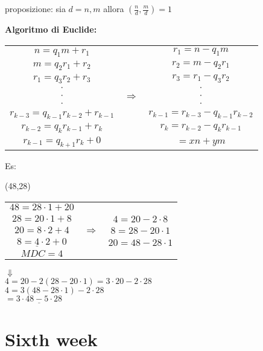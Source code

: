 \documentclass[12pt, a4paper]{article}
\begin{document}
proposizione: sia $d=n,m$ allora $(\frac{n}{d},\frac{m}{d})=1$

\textbf{Algoritmo di Euclide:}
\begin{center}
    \begin{tabular}{ c c c }
        
        $n=q_{1}m+r_{1}$ & & $r_{1}=n-q_{1}m$\\
        $m=q_{2}r_{1}+r_{2}$ & & $r_{2}=m-q_{2}r_{1}$\\
        $r_{1}=q_{3}r_{2}+r_{3}$ & &$r_{3}=r_{1}-q_{3}r_{2}$\\
        $\cdot$ & &$\cdot$\\
        $\cdot$ & $\Rightarrow$ & $\cdot$\\
        $\cdot$ & & $\cdot$\\
        $r_{k-3}=q_{k-1}r_{k-2}+r_{k-1}$ & &$r_{k-1}=r_{k-3}-q_{k-1}r_{k-2}$\\
        $r_{k-2}=q_{k}r_{k-1}+r_{k}$ & & $r_{k}=r_{k-2}-q_{k}r_{k-1}$\\
        $r_{k-1}=q_{k+1}r_{k}+0$ & & $= xn+ym$
        
    \end{tabular}
\end{center}

Es:
\begin{center}
    (48,28)

    \begin{tabular}{ c c c }
        $48=28\cdot 1 + 20$ & &\\
        $28=20\cdot 1 + 8$ && $4=20-2\cdot 8$\\
        $20=8\cdot 2 + 4$ &$\Rightarrow$& $8=28-20\cdot 1$\\
        $8=\underline{4}\cdot 2 + 0$ &&$20 = 48-28\cdot 1$\\
        $MDC = 4$&&\\
    \end{tabular}

    $\Downarrow$\\
    $4=20-2(28-20\cdot 1)=3\cdot 20 - 2\cdot 28$\\
    $4=3(48-28\cdot 1)-2\cdot 28$\\
    $=\underline{3\cdot 48 - 5\cdot 28}$

\end{center}

\newpage
\section{Sixth week}
\end{document}
